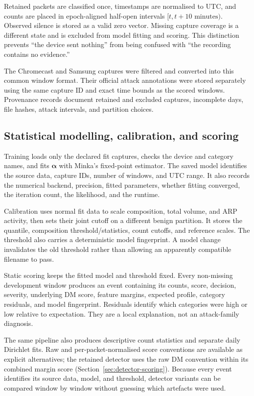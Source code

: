 Retained packets are classified once, timestamps are normalised to UTC, and
counts are placed in epoch-aligned half-open intervals $[t,t+10\text{ minutes})$.
Observed silence is stored as a valid zero vector. Missing capture coverage is a
different state and is excluded from model fitting and scoring. This distinction
prevents ``the device sent nothing'' from being confused with ``the recording
contains no evidence.''

The Chromecast and Samsung captures were filtered and converted into this common
window format. Their official attack annotations were stored separately using
the same capture ID and exact time bounds as the scored windows. Provenance
records document retained and excluded captures, incomplete days, file hashes,
attack intervals, and partition choices.

\subsection{Statistical modelling, calibration, and scoring}

Training loads only the declared fit captures, checks the device and category
names, and fits $\boldsymbol{\alpha}$ with Minka's fixed-point estimator. The
saved model identifies the source data, capture IDs, number of windows, and UTC
range. It also records the numerical backend, precision, fitted parameters,
whether fitting converged, the iteration count, the likelihood, and the runtime.

Calibration uses normal fit data to scale composition, total volume, and ARP
activity, then sets their joint cutoff on a different benign partition. It
stores the quantile, composition threshold/statistics, count cutoffs, and
reference scales. The threshold
also carries a deterministic model fingerprint. A model change invalidates the
old threshold rather than allowing an apparently compatible filename to pass.

Static scoring keeps the fitted model and threshold fixed. Every non-missing
development window produces an event containing its counts, score, decision,
severity, underlying DM score, feature margins, expected profile, category
residuals, and model fingerprint. Residuals
identify which categories were high or low relative to expectation. They are a
local explanation, not an attack-family diagnosis.

The same pipeline also produces descriptive count statistics and separate daily
Dirichlet fits. Raw and per-packet-normalised score conventions are available as
explicit alternatives; the retained detector uses the raw DM convention within
its combined margin score (Section~\ref{sec:detector-scoring}).
Because every event identifies its source data, model, and threshold, detector
variants can be compared window by window without guessing which artefacts were
used.

